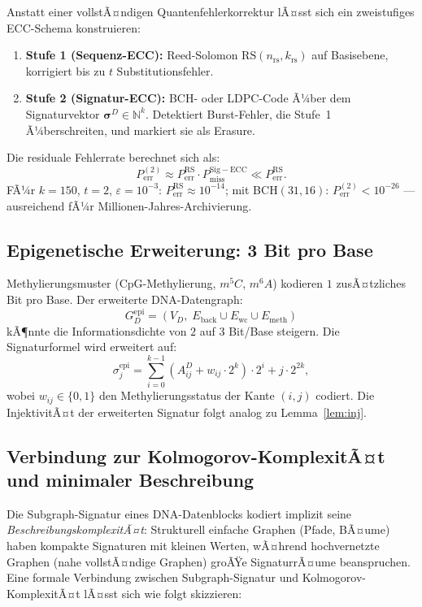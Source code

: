 ﻿\documentclass[a4paper,12pt]{article}
\theoremstyle{definition}
\theoremstyle{plain}
\begin{document}
Anstatt einer vollstÃ¤ndigen Quantenfehlerkorrektur lÃ¤sst sich ein
zweistufiges ECC-Schema konstruieren:
\begin{enumerate}
  \item \textbf{Stufe 1 (Sequenz-ECC):} Reed-Solomon
        $\mathrm{RS}(n_{\mathrm{rs}}, k_{\mathrm{rs}})$ auf Basisebene,
        korrigiert bis zu $t$ Substitutionsfehler.
  \item \textbf{Stufe 2 (Signatur-ECC):} BCH- oder LDPC-Code Ã¼ber dem
        Signaturvektor $\boldsymbol{\sigma}^D \in \mathbb{N}^k$.
        Detektiert Burst-Fehler, die Stufe~1 Ã¼berschreiten, und markiert
        sie als Erasure.
\end{enumerate}
Die residuale Fehlerrate berechnet sich als:
\[
  P_{\mathrm{err}}^{(2)} \approx P_{\mathrm{err}}^{\mathrm{RS}} \cdot
  P_{\mathrm{miss}}^{\mathrm{Sig-ECC}} \ll P_{\mathrm{err}}^{\mathrm{RS}}.
\]
FÃ¼r $k=150$, $t=2$, $\varepsilon = 10^{-3}$: $P_{\mathrm{err}}^{\mathrm{RS}}
\approx 10^{-14}$; mit BCH$(31,16)$: $P_{\mathrm{err}}^{(2)} < 10^{-26}$ ---
ausreichend fÃ¼r Millionen-Jahres-Archivierung.

\subsection{Epigenetische Erweiterung: 3 Bit pro Base}
\label{ssec:epigenetik}

Methylierungsmuster (CpG-Methylierung, $m^5C$, $m^6A$) kodieren
$1$ zusÃ¤tzliches Bit pro Base.  Der erweiterte DNA-Datengraph:
\[
  G_D^{\mathrm{epi}} = (V_D,\;
  E_{\mathrm{back}} \cup E_{\mathrm{wc}} \cup E_{\mathrm{meth}})
\]
kÃ¶nnte die Informationsdichte von $2$ auf $3$ Bit/Base steigern.
Die Signaturformel wird erweitert auf:
\[
  \sigma_j^{\mathrm{epi}} = \sum_{i=0}^{k-1}
  (A^D_{ij} + w_{ij} \cdot 2^k) \cdot 2^i + j \cdot 2^{2k},
\]
wobei $w_{ij} \in \{0,1\}$ den Methylierungsstatus der Kante $(i,j)$ codiert.
Die InjektivitÃ¤t der erweiterten Signatur folgt analog zu Lemma~\ref{lem:inj}.

\subsection{Verbindung zur Kolmogorov-KomplexitÃ¤t und minimaler Beschreibung}
\label{ssec:kolmogorov}

Die Subgraph-Signatur eines DNA-Datenblocks kodiert implizit seine
\emph{BeschreibungskomplexitÃ¤t}: Strukturell einfache Graphen (Pfade,
BÃ¤ume) haben kompakte Signaturen mit kleinen Werten, wÃ¤hrend hochvernetzte
Graphen (nahe vollstÃ¤ndige Graphen) groÃŸe SignaturrÃ¤ume beanspruchen.
Eine formale Verbindung zwischen Subgraph-Signatur und Kolmogorov-KomplexitÃ¤t
lÃ¤sst sich wie folgt skizzieren:
\end{document}
